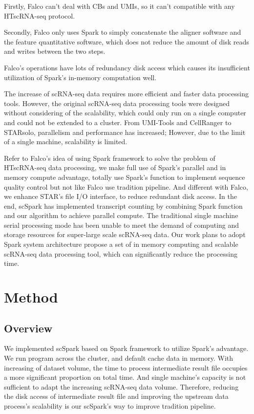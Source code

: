 \documentclass[runningheads]{llncs}
\begin{document}
Firstly, Falco can't deal with CBs and UMIs, so it can't compatible with any HTscRNA-seq protocol.

Secondly, Falco only uses Spark to simply concatenate the aligner software and the feature quantitative software, which does not reduce the amount of disk reads and writes between the two steps.

Falco’s operations have lots of redundancy disk access which causes its insufficient utilization of Spark’s in-memory computation well.

The increase of scRNA-seq data requires more efficient and faster data processing tools. However, the original scRNA-seq data processing tools were designed without considering of the scalability, which could only run on a single computer and could not be extended to a cluster. From UMI-Tools and CellRanger to STARsolo, parallelism and performance has increased; However, due to the limit of a single machine, scalability is limited.

Refer to Falco's idea of using Spark framework to solve the problem of HTscRNA-seq data processing, we make full use of Spark's parallel and in memory compute advantage, totally use Spark's function to implement sequence quality control but not like Falco use tradition pipeline.
And different with Falco, we enhance STAR's file I/O interface, to reduce redundant disk access.
In the end, scSpark has implemented transcript counting by combining Spark function and our algorithm to achieve parallel compute.
The traditional single machine serial processing mode has been unable to meet the demand of computing and storage resources for super-large scale scRNA-seq data.
Our work plans to adopt Spark system architecture propose a set of in memory computing and scalable scRNA-seq data processing tool, which can significantly reduce the processing time.

\section{Method}
\subsection{Overview}
We implemented scSpark based on Spark framework to utilize Spark's advantage.
We run program across the cluster, and default cache data in memory.
With increasing of dataset volume, the time to process intermediate result file occupies a more significant proportion on total time.
And single machine's capacity is not sufficient to adapt the increasing scRNA-seq data volume.
Therefore, reducing the disk access of intermediate result file and improving the upstream data process's scalability is our scSpark's way to improve tradition pipeline.
\end{document}
